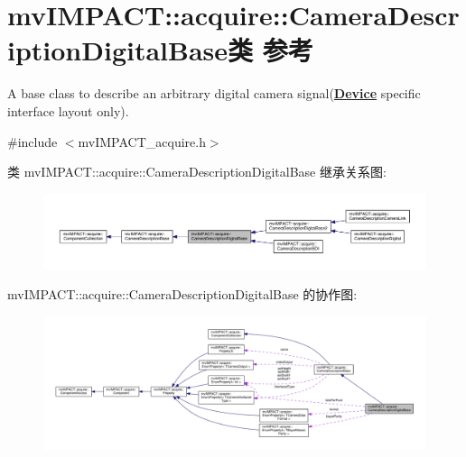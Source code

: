 \hypertarget{classmv_i_m_p_a_c_t_1_1acquire_1_1_camera_description_digital_base}{\section{mv\+I\+M\+P\+A\+C\+T\+:\+:acquire\+:\+:Camera\+Description\+Digital\+Base类 参考}
\label{classmv_i_m_p_a_c_t_1_1acquire_1_1_camera_description_digital_base}
}


A base class to describe an arbitrary digital camera signal({\bfseries \hyperlink{classmv_i_m_p_a_c_t_1_1acquire_1_1_device}{Device}} specific interface layout only).  




{\ttfamily \#include $<$mv\+I\+M\+P\+A\+C\+T\+\_\+acquire.\+h$>$}



类 mv\+I\+M\+P\+A\+C\+T\+:\+:acquire\+:\+:Camera\+Description\+Digital\+Base 继承关系图\+:
\nopagebreak
\begin{figure}[H]
\begin{center}
\leavevmode
\includegraphics[width=350pt]{classmv_i_m_p_a_c_t_1_1acquire_1_1_camera_description_digital_base__inherit__graph}
\end{center}
\end{figure}


mv\+I\+M\+P\+A\+C\+T\+:\+:acquire\+:\+:Camera\+Description\+Digital\+Base 的协作图\+:
\nopagebreak
\begin{figure}[H]
\begin{center}
\leavevmode
\includegraphics[width=350pt]{classmv_i_m_p_a_c_t_1_1acquire_1_1_camera_description_digital_base__coll__graph}
\end{center}
\end{figure}
